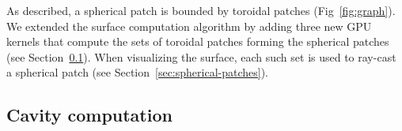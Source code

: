 As described, a spherical patch is bounded by toroidal patches (Fig~\ref{fig:graph}). We extended the surface computation algorithm by adding three new GPU kernels that compute the sets of toroidal patches forming the spherical patches (see Section~\ref{sec:graph}).
When visualizing the surface, each such set is used to ray-cast a spherical patch (see Section~\ref{sec:spherical-patches}).


\subsection{Cavity computation}
\label{sec:graph}
   

